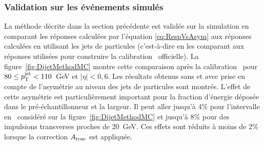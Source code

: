 \subsubsection{Validation sur les \'ev\'enements simul\'es}
\label{sec:ValidationDiJetMC}

La m\'ethode d\'ecrite dans la section pr\'ec\'edente est valid\'ee sur la simulation en comparant les r\'eponses calcul\'ees par l'\'equation \ref{eq:RespVsAsym} aux r\'eponses calcul\'ees en utilisant les jets de particules (c'est-\`a-dire en les comparant aux r\'eponses utilis\'ees pour construire la calibration \GS~officielle). La figure~\ref{fig:DijetMethodMC} montre cette comparaison apr\`es la calibration \EMJES~pour $80 \le p_{\mathrm{T}}^\mathrm{jet} < 110$~GeV et $|\eta| < 0,6$. Les r\'esultats obtenus sans et avec prise en compte de l'asym\'etrie au niveau des jets de particules sont montr\'es. L'effet de cette asym\'etrie est particuli\`erement important pour la fraction d'\'energie d\'epos\'ee dans le pr\'e-\'echantillonneur et la largeur. Il peut aller jusqu'\`a 4\% pour l'intervalle en \pt~consid\'er\'e sur la figure~\ref{fig:DijetMethodMC} et jusqu'\`a 8\% pour des impulsions transverses proches de 20~GeV. Ces effets sont r\'eduits \`a moins de 2\% lorsque la correction $A_{\rm true}$ est appliqu\'ee. 

